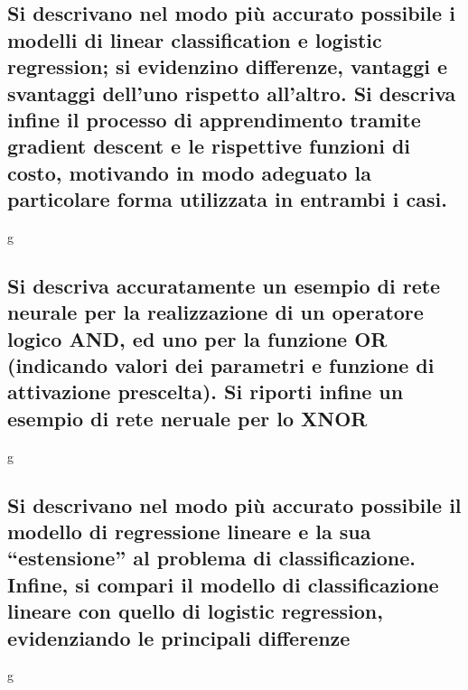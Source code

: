 \documentclass[10pt,oneside,a4paper]{article}
\begin{document}
\subsection{Si descrivano nel modo più accurato possibile i modelli di linear classification e logistic regression; si evidenzino differenze, vantaggi e svantaggi dell’uno rispetto all’altro. Si descriva infine il processo di apprendimento tramite gradient descent e le rispettive funzioni di costo, motivando in modo adeguato la particolare forma utilizzata in entrambi i casi.}
g
\subsection{Si descriva accuratamente un esempio di rete neurale per la realizzazione di un operatore logico AND, ed uno per la funzione OR (indicando valori dei parametri e funzione di attivazione prescelta). Si riporti infine un esempio di rete neruale per lo XNOR}
g
\subsection{Si descrivano nel modo più accurato possibile il modello di regressione lineare e la sua “estensione” al problema di classificazione. Infine, si compari il modello di classificazione lineare con quello di logistic regression, evidenziando le principali differenze}
g
\end{document}
